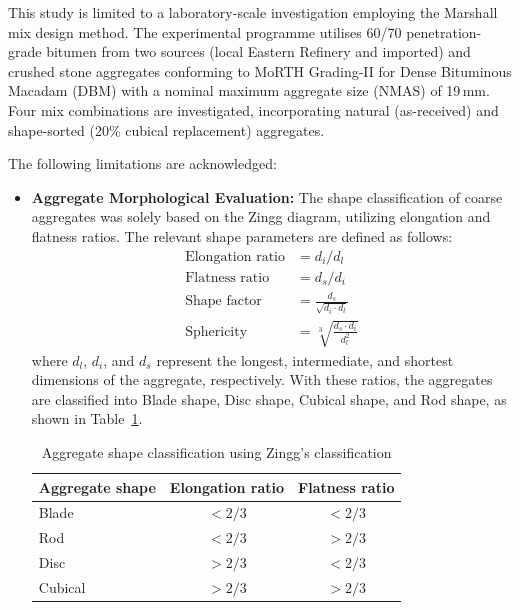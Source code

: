 \documentclass[12pt,a4paper]{article}
\begin{document}
This study is limited to a laboratory-scale investigation employing the Marshall mix design method. The experimental programme utilises 60/70 penetration-grade bitumen from two sources (local Eastern Refinery and imported) and crushed stone aggregates conforming to MoRTH Grading-II for Dense Bituminous Macadam (DBM) with a nominal maximum aggregate size (NMAS) of 19\,mm. Four mix combinations are investigated, incorporating natural (as-received) and shape-sorted (20\% cubical replacement) aggregates.

The following limitations are acknowledged:
\begin{itemize}
    \item \textbf{Aggregate Morphological Evaluation:} The shape classification of coarse aggregates was solely based on the Zingg diagram, utilizing elongation and flatness ratios. The relevant shape parameters are defined as follows:
    \begin{align*}
        \text{Elongation ratio} &= d_i / d_l \\
        \text{Flatness ratio} &= d_s / d_i \\
        \text{Shape factor} &= \frac{d_s}{\sqrt{d_i \cdot d_l}} \\
        \text{Sphericity} &= \sqrt[3]{\frac{d_s \cdot d_i}{d_l^2}}
    \end{align*}
    where $d_l$, $d_i$, and $d_s$ represent the longest, intermediate, and shortest dimensions of the aggregate, respectively. With these ratios, the aggregates are classified into Blade shape, Disc shape, Cubical shape, and Rod shape, as shown in Table~\ref{tab:shape_classification_limitations}.
    
    \begin{table}[H]
        \centering
        \caption{Aggregate shape classification using Zingg's classification}
        \label{tab:shape_classification_limitations}
        \begin{tabular}{@{}lcc@{}}
            \toprule
            \textbf{Aggregate shape} & \textbf{Elongation ratio} & \textbf{Flatness ratio} \\
            \midrule
            Blade & $< 2/3$ & $< 2/3$ \\
            Rod & $< 2/3$ & $> 2/3$ \\
            Disc & $> 2/3$ & $< 2/3$ \\
            Cubical & $> 2/3$ & $> 2/3$ \\
            \bottomrule
        \end{tabular}
    \end{table}


\end{itemize}
\end{document}
